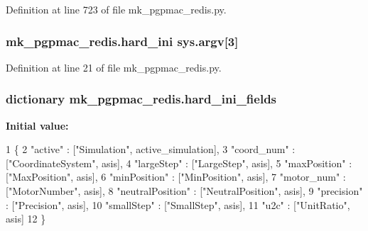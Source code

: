 Definition at line 723 of file mk\-\_\-pgpmac\-\_\-redis.\-py.

\hypertarget{namespacemk__pgpmac__redis_a5864d9c27cbe61534756880cbfebe4f1}{
\subsubsection[{hard\-\_\-ini}]{\setlength{\rightskip}{0pt plus 5cm}mk\-\_\-pgpmac\-\_\-redis.\-hard\-\_\-ini sys.\-argv\mbox{[}3\mbox{]}}}\label{namespacemk__pgpmac__redis_a5864d9c27cbe61534756880cbfebe4f1}


Definition at line 21 of file mk\-\_\-pgpmac\-\_\-redis.\-py.

\hypertarget{namespacemk__pgpmac__redis_a8257226983aee079ec66f5cc67e194ec}{
\subsubsection[{hard\-\_\-ini\-\_\-fields}]{\setlength{\rightskip}{0pt plus 5cm}dictionary mk\-\_\-pgpmac\-\_\-redis.\-hard\-\_\-ini\-\_\-fields}}\label{namespacemk__pgpmac__redis_a8257226983aee079ec66f5cc67e194ec}
{\bfseries Initial value\-:}
\begin{DoxyCode}
1 \{
2     \textcolor{stringliteral}{"active"}          : [\textcolor{stringliteral}{"Simulation"}, active\_simulation],
3     \textcolor{stringliteral}{"coord\_num"}       : [\textcolor{stringliteral}{"CoordinateSystem"}, asis],
4     \textcolor{stringliteral}{"largeStep"}       : [\textcolor{stringliteral}{"LargeStep"}, asis],
5     \textcolor{stringliteral}{"maxPosition"}     : [\textcolor{stringliteral}{"MaxPosition"}, asis],
6     \textcolor{stringliteral}{"minPosition"}     : [\textcolor{stringliteral}{"MinPosition"}, asis],
7     \textcolor{stringliteral}{"motor\_num"}       : [\textcolor{stringliteral}{"MotorNumber"}, asis],
8     \textcolor{stringliteral}{"neutralPosition"} : [\textcolor{stringliteral}{"NeutralPosition"}, asis],
9     \textcolor{stringliteral}{"precision"}       : [\textcolor{stringliteral}{"Precision"}, asis],
10     \textcolor{stringliteral}{"smallStep"}       : [\textcolor{stringliteral}{"SmallStep"}, asis],
11     \textcolor{stringliteral}{"u2c"}             : [\textcolor{stringliteral}{"UnitRatio"}, asis]
12     \}
\end{DoxyCode}


